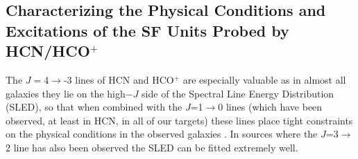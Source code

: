 \documentclass[legal,11pt]{article}
\def\to{$\rightarrow$}
\def\HCOP       {HCO$^{+}$}
\begin{document}
%
%
%
%
%
%




\subsection{Characterizing the Physical Conditions and
Excitations of the SF Units Probed by HCN/\HCOP} 

The $J=$4\to-3 lines of HCN and HCO$^+$ are especially valuable as in almost
all galaxies they lie on the high$-J$ side of the Spectral Line Energy
Distribution (SLED), so that when combined with the $J$=1\to0 lines (which have
been observed, at least in HCN, in all of our targets) these lines place tight
constraints on the physical conditions in the observed galaxies
\citep[e.g.,][]{PPP2014}. In sources where the $J$=3\to2 line has also been
observed the SLED can be fitted extremely well.
\end{document}
